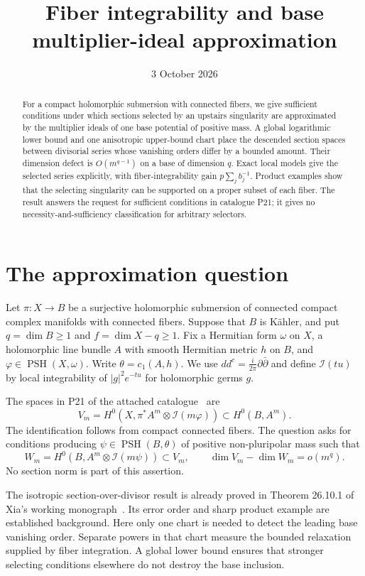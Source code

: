 \documentclass[11pt]{article}
\title{Fiber integrability and base multiplier-ideal approximation}
\author{}
\date{3 October 2026}
\newcommand{\ddc}{dd^c}
\newcommand{\cI}{\mathcal I}
\newcommand{\PSH}{\operatorname{PSH}}
\begin{document}
\maketitle
\begin{abstract}
For a compact holomorphic submersion with connected fibers, we give sufficient
conditions under which sections selected by an upstairs singularity are
approximated by the multiplier ideals of one base potential of positive mass.
A global logarithmic lower bound and one anisotropic upper-bound chart place
the descended section spaces between divisorial series whose vanishing orders
differ by a bounded amount. Their dimension defect is $O(m^{q-1})$ on a base
of dimension $q$. Exact local models give the selected series explicitly,
with fiber-integrability gain $p\sum_j b_j^{-1}$. Product examples show that
the selecting singularity can be supported on a proper subset of each fiber.
The result answers the request for sufficient conditions in catalogue P21;
it gives no necessity-and-sufficiency classification for arbitrary selectors.
\end{abstract}

\section{The approximation question}
Let $\pi:X\to B$ be a surjective holomorphic submersion of connected compact
complex manifolds with connected fibers. Suppose that $B$ is K\"ahler, and
put $q=\dim B\geq1$ and $f=\dim X-q\geq1$. Fix a Hermitian form $\omega$
on $X$, a holomorphic line bundle $A$ with smooth Hermitian metric $h$ on
$B$, and $\varphi\in\PSH(X,\omega)$. Write $\theta=c_1(A,h)$.
We use $\ddc=\frac{i}{2\pi}\partial\bar\partial$ and define $\cI(tu)$ by
local integrability of $|g|^2e^{-tu}$ for holomorphic germs $g$.

The spaces in P21 of the attached catalogue~\cite{catalogue} are
\[
 V_m=H^0(X,\pi^*A^m\otimes\cI(m\varphi))\subset H^0(B,A^m).
\]
The identification follows from compact connected fibers. The question asks
for conditions producing $\psi\in\PSH(B,\theta)$ of positive
non-pluripolar mass such that
\[
 W_m=H^0(B,A^m\otimes\cI(m\psi))\subset V_m,
 \qquad \dim V_m-\dim W_m=o(m^q).
\]
No section norm is part of this assertion.

The isotropic section-over-divisor result is already proved in
Theorem 26.10.1 of Xia's working monograph~\cite{book}. Its error order and
sharp product example are established background. Here only one chart is
needed to detect the leading base vanishing order. Separate powers in that
chart measure the bounded relaxation supplied by fiber integration. A global
lower bound ensures that stronger selecting conditions elsewhere do not
destroy the base inclusion.
\end{document}
